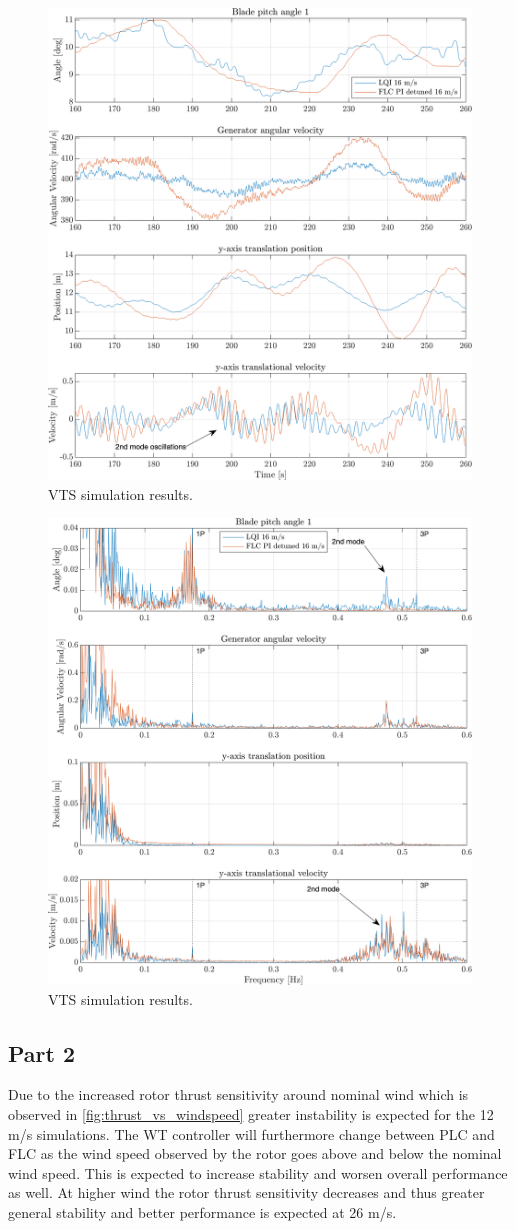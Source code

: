 \begin{figure}[ht]
	\centering
	\includegraphics[width=0.7\linewidth]{Graphics/TestResults/VTSplotting/12_zoom_th_w_py_vy.png}
	\caption{VTS simulation results.}
	\label{fig:vts_12_zoom_th_w_py_vy}
\end{figure}

\begin{figure}[ht]
	\centering
	\includegraphics[width=0.7\linewidth]{Graphics/TestResults/VTSplotting/13_zoom_fft_th_w_py_vy.png}
	\caption{VTS simulation results.}
	\label{fig:vts_13_zoom_fft_th_w_py_vy}
\end{figure}

\subsection{Part 2}
Due to the increased rotor thrust sensitivity around nominal wind which is observed in \cref{fig:thrust_vs_windspeed} greater instability is expected for the 12 m/s simulations. The WT controller will furthermore change between PLC and FLC as the wind speed observed by the rotor goes above and below the nominal wind speed. This is expected to increase stability and worsen overall performance as well. At higher wind the rotor thrust sensitivity decreases and thus greater general stability and better performance is expected at 26 m/s.